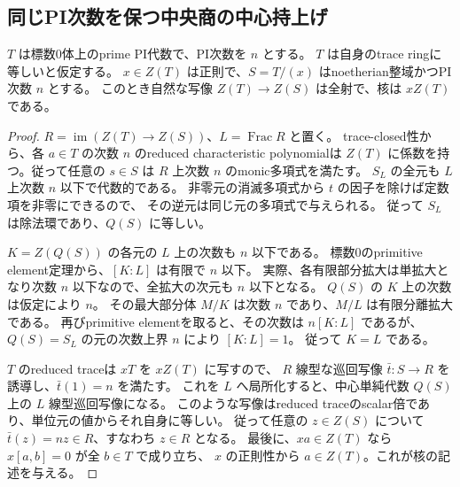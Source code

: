 \subsection{同じPI次数を保つ中央商の中心持上げ}
\label{subsec:cubic-third-root-unit-boundary-L-trace-center}
\begin{lemma}
\label{lem:cubic-trace-closed-central-reduction}
$T$ は標数0体上のprime PI代数で、PI次数を $n$ とする。
$T$ は自身のtrace ringに等しいと仮定する。
$x\in Z(T)$ は正則で、$S=T/(x)$ はnoetherian整域かつPI次数 $n$ とする。
このとき自然な写像 $Z(T)\to Z(S)$ は全射で、核は $xZ(T)$ である。
\end{lemma}
\begin{proof}
$R=\operatorname{im}(Z(T)\to Z(S))$、$L=\operatorname{Frac}R$ と置く。
trace-closed性から、各 $a\in T$ の次数 $n$ のreduced characteristic polynomialは
$Z(T)$ に係数を持つ。従って任意の $s\in S$ は $R$ 上次数 $n$ のmonic多項式を満たす。
$S_L$ の全元も $L$ 上次数 $n$ 以下で代数的である。
非零元の消滅多項式から $t$ の因子を除けば定数項を非零にできるので、
その逆元は同じ元の多項式で与えられる。
従って $S_L$ は除法環であり、$Q(S)$ に等しい。

$K=Z(Q(S))$ の各元の $L$ 上の次数も $n$ 以下である。
標数0のprimitive element定理から、$[K:L]$ は有限で $n$ 以下。
実際、各有限部分拡大は単拡大となり次数 $n$ 以下なので、全拡大の次元も $n$ 以下となる。
$Q(S)$ の $K$ 上の次数は仮定により $n$。
その最大部分体 $M/K$ は次数 $n$ であり、$M/L$ は有限分離拡大である。
再びprimitive elementを取ると、その次数は $n[K:L]$ であるが、
$Q(S)=S_L$ の元の次数上界 $n$ により $[K:L]=1$。
従って $K=L$ である。

$T$ のreduced traceは $xT$ を $xZ(T)$ に写すので、
$R$ 線型な巡回写像 $\bar t:S\to R$ を誘導し、$\bar t(1)=n$ を満たす。
これを $L$ へ局所化すると、中心単純代数 $Q(S)$ 上の $L$ 線型巡回写像になる。
このような写像はreduced traceのscalar倍であり、単位元の値からそれ自身に等しい。
従って任意の $z\in Z(S)$ について $\bar t(z)=nz\in R$、すなわち $z\in R$ となる。
最後に、$xa\in Z(T)$ なら $x[a,b]=0$ が全 $b\in T$ で成り立ち、
$x$ の正則性から $a\in Z(T)$。これが核の記述を与える。
\end{proof}

